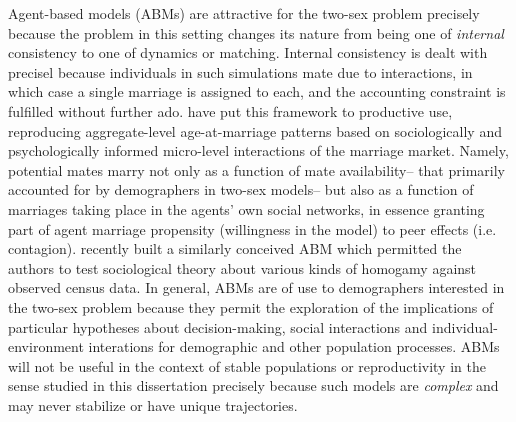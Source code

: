 Agent-based models (ABMs) are attractive for the two-sex problem
precisely because the problem in this setting changes its nature from being one of \textit{internal} consistency 
to one of dynamics or matching. Internal consistency is dealt with precisel because 
individuals in such simulations mate due to interactions,
in which case a single marriage is assigned to each, and the accounting
constraint is fulfilled without further ado. \citet{billari2002wedding} have put
this framework to productive use, reproducing aggregate-level age-at-marriage
patterns based on sociologically and psychologically informed micro-level
interactions of the marriage market. Namely, potential mates marry not only as a
function of mate availability-- that primarily accounted for by demographers
in two-sex models-- but also as a function of marriages taking place in the
agents' own social networks, in essence granting part of agent marriage
propensity (willingness in the model) to peer effects (i.e. contagion).
\citet{walker2013modelling} recently built a similarly conceived ABM which
permitted the authors to test sociological theory about various kinds of 
homogamy against observed census data. In general, ABMs are of use to demographers interested in
the two-sex problem because they permit the exploration of the implications of
particular hypotheses about decision-making, social interactions and individual-environment
interations for demographic and other population processes. ABMs will not be
useful in the context of stable populations or reproductivity in the sense
studied in this dissertation precisely because such models are \textit{complex}
and may never stabilize or have unique trajectories.

